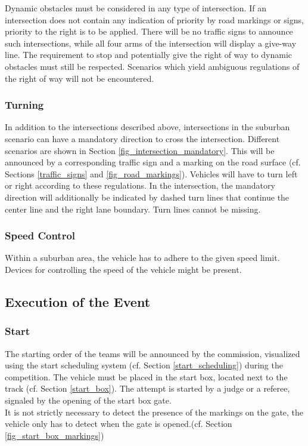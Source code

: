 Dynamic obstacles must be considered in any type of intersection. If an
intersection does not contain any indication of priority by road markings or
signs, priority to the right is to be applied. There will be no traffic signs
to announce such intersections, while all four arms of the intersection will
display a give-way line. The requirement to stop and potentially give the right
of way to dynamic obstacles must still be respected. Scenarios which yield
ambiguous regulations of the right of way will not be encountered.

\subsubsection{Turning}
\label{turning}

In addition to the intersections described above, intersections in the suburban
scenario can have a mandatory direction to cross the intersection. Different
scenarios are shown in Section \ref{fig_intersection_mandatory}. This will be
announced by a corresponding traffic sign and a marking on the road surface
(cf. Sections \ref{traffic_signs} and \ref{fig_road_markings}). Vehicles will
have to turn left or right according to these regulations. In the intersection,
the mandatory direction will additionally be indicated by dashed turn lines
that continue the center line and the right lane boundary. Turn lines cannot be
missing.

\subsubsection{Speed Control}

Within a suburban area, the vehicle has to adhere to the given speed limit.
Devices for controlling the speed of the vehicle might be present.

\subsection{Execution of the Event}

\subsubsection{Start}

The starting order of the teams will be announced by the commission, visualized
using the start scheduling system (cf. Section \ref{start_scheduling}) during
the competition. The vehicle must be placed in the start box, located next to
the track (cf. Section \ref{start_box}). The attempt is started by a judge or a
referee, signaled by the opening of the start box gate.\\ It is not strictly
necessary to detect the presence of the markings on the gate, the vehicle only
has to detect when the gate is opened.(cf. Section
\ref{fig_start_box_markings})

